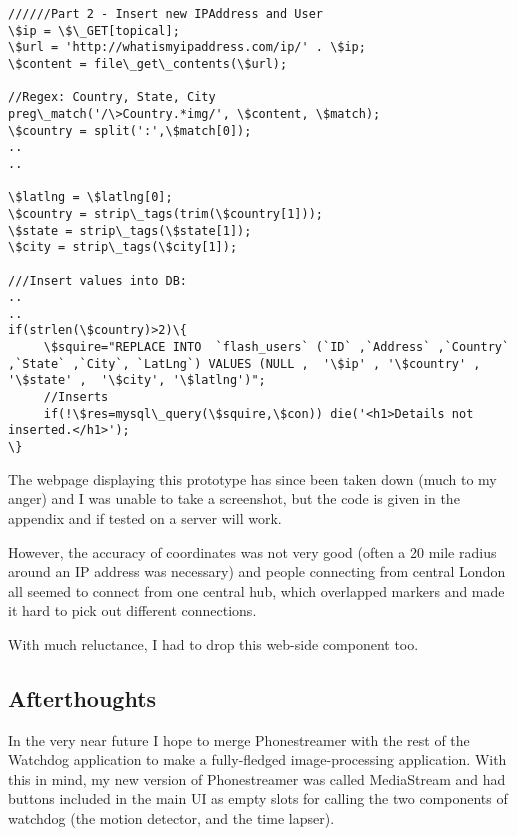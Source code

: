 \begin{lstlisting}[title=\bf Snippet from insert.php]
//////Part 2 - Insert new IPAddress and User
\$ip = \$\_GET[topical];
\$url = 'http://whatismyipaddress.com/ip/' . \$ip;
\$content = file\_get\_contents(\$url);

//Regex: Country, State, City
preg\_match('/\>Country.*img/', \$content, \$match); 
\$country = split(':',\$match[0]);
..
..

\$latlng = \$latlng[0];
\$country = strip\_tags(trim(\$country[1]));
\$state = strip\_tags(\$state[1]);
\$city = strip\_tags(\$city[1]);

///Insert values into DB:
..
..
if(strlen(\$country)>2)\{
     \$squire="REPLACE INTO  `flash_users` (`ID` ,`Address` ,`Country` ,`State` ,`City`, `LatLng`) VALUES (NULL ,  '\$ip' , '\$country' , '\$state' ,  '\$city', '\$latlng')";
     //Inserts
     if(!\$res=mysql\_query(\$squire,\$con)) die('<h1>Details not inserted.</h1>');
\}
\end{lstlisting}

The webpage displaying this prototype has since been taken down (much to my anger) and I was unable to take a screenshot, but the code is given in the appendix and if tested on a server will work.

However, the accuracy of coordinates was not very good (often a 20 mile radius around an IP address was necessary) and people connecting from central London all seemed to connect from one central hub, which overlapped markers and made it hard to pick out different connections.

With much reluctance, I had to drop this web-side component too.

\subsection{Afterthoughts}
In the very near future I hope to merge Phonestreamer with the rest of the Watchdog application to make a fully-fledged image-processing application. With this in mind, my new version of Phonestreamer was called MediaStream and had buttons included in the main UI as empty slots for calling the two components of watchdog (the motion detector, and the time lapser).


%
%